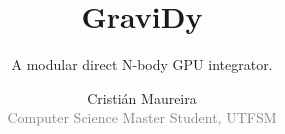 \documentclass{beamer}
\author[Cristián Maureira]
       {\large Cristián Maureira\\
        \small \textcolor{gray}{Computer Science Master Student, UTFSM}}
\title[GraviDy]
      {\huge GraviDy}
\subtitle{\Large A modular direct N-body GPU integrator.}
\institute[AEI]
          {Albert Einstein Institute}
\begin{document}
\begin{frame}[t,plain]
    \titlepage
\end{frame}








\begin{frame}[t,plain]
\titlepage
\end{frame}
\end{document}
